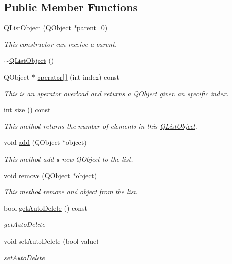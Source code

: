 \subsection*{Public Member Functions}
\begin{DoxyCompactItemize}
\item 
\hyperlink{class_c_w_f_1_1_q_list_object_a6b056337424f80209ceabb4a3e13b9f8}{Q\+List\+Object} (Q\+Object $\ast$parent=0)
\begin{DoxyCompactList}\small\item\em This constructor can receive a parent. \end{DoxyCompactList}\item 
\hyperlink{class_c_w_f_1_1_q_list_object_a9d1a062c955dad25d5b6261d73f6c87c}{$\sim$\+Q\+List\+Object} ()
\item 
Q\+Object $\ast$ \hyperlink{class_c_w_f_1_1_q_list_object_a987e849c926c80558272f6d0fc019fae}{operator\mbox{[}$\,$\mbox{]}} (int index) const 
\begin{DoxyCompactList}\small\item\em This is an operator overload and returns a Q\+Object given an specific index. \end{DoxyCompactList}\item 
int \hyperlink{class_c_w_f_1_1_q_list_object_a2de65b58fcc28b3d40de2af763b5e6f4}{size} () const 
\begin{DoxyCompactList}\small\item\em This method returns the number of elements in this \hyperlink{class_c_w_f_1_1_q_list_object}{Q\+List\+Object}. \end{DoxyCompactList}\item 
void \hyperlink{class_c_w_f_1_1_q_list_object_ac05809bbe119d6d4964efd721d0bef3a}{add} (Q\+Object $\ast$object)
\begin{DoxyCompactList}\small\item\em This method add a new Q\+Object to the list. \end{DoxyCompactList}\item 
void \hyperlink{class_c_w_f_1_1_q_list_object_a4d8b3e00c8ee8add45a473582ec0253b}{remove} (Q\+Object $\ast$object)
\begin{DoxyCompactList}\small\item\em This method remove and object from the list. \end{DoxyCompactList}\item 
bool \hyperlink{class_c_w_f_1_1_q_list_object_a8154d32ef214c0e765aebd29cc284572}{get\+Auto\+Delete} () const 
\begin{DoxyCompactList}\small\item\em get\+Auto\+Delete \end{DoxyCompactList}\item 
void \hyperlink{class_c_w_f_1_1_q_list_object_aefb8c78635548e4fba6e47449d47353c}{set\+Auto\+Delete} (bool value)
\begin{DoxyCompactList}\small\item\em set\+Auto\+Delete \end{DoxyCompactList}\end{DoxyCompactItemize}


